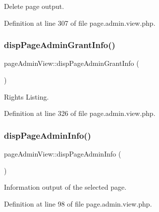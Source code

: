 Delete page output. 



Definition at line 307 of file page.\+admin.\+view.\+php.

\hypertarget{classpageAdminView_a51ce83a82d62f211ec602e2218837500}{}\label{classpageAdminView_a51ce83a82d62f211ec602e2218837500} 
\subsubsection{\texorpdfstring{disp\+Page\+Admin\+Grant\+Info()}{dispPageAdminGrantInfo()}}
{\footnotesize\ttfamily page\+Admin\+View\+::disp\+Page\+Admin\+Grant\+Info (\begin{DoxyParamCaption}{ }\end{DoxyParamCaption})}



Rights Listing. 



Definition at line 326 of file page.\+admin.\+view.\+php.

\hypertarget{classpageAdminView_aa240ff3b2c7b2befcf4c572916c37ac4}{}\label{classpageAdminView_aa240ff3b2c7b2befcf4c572916c37ac4} 
\subsubsection{\texorpdfstring{disp\+Page\+Admin\+Info()}{dispPageAdminInfo()}}
{\footnotesize\ttfamily page\+Admin\+View\+::disp\+Page\+Admin\+Info (\begin{DoxyParamCaption}{ }\end{DoxyParamCaption})}



Information output of the selected page. 



Definition at line 98 of file page.\+admin.\+view.\+php.

\hypertarget{classpageAdminView_a49a338d91abaf7b5903a06d3c9467b34}{}\label{classpageAdminView_a49a338d91abaf7b5903a06d3c9467b34} 
